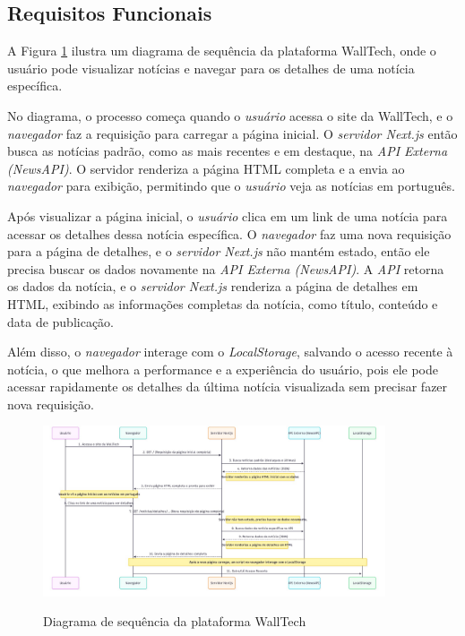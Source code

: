 \subsection{Requisitos Funcionais}
\label{subsec:requisitos-funcionais}
A Figura \ref{fig:sequence-diagram} ilustra um diagrama de sequência da plataforma WallTech, onde o usuário pode visualizar notícias e navegar para os detalhes de uma notícia específica.

No diagrama, o processo começa quando o \textit{usuário} acessa o site da WallTech, e o \textit{navegador} faz a requisição para carregar a página inicial. O \textit{servidor Next.js} então busca as notícias padrão, como as mais recentes e em destaque, na \textit{API Externa (NewsAPI)}. O servidor renderiza a página HTML completa e a envia ao \textit{navegador} para exibição, permitindo que o \textit{usuário} veja as notícias em português.

Após visualizar a página inicial, o \textit{usuário} clica em um link de uma notícia para acessar os detalhes dessa notícia específica. O \textit{navegador} faz uma nova requisição para a página de detalhes, e o \textit{servidor Next.js} não mantém estado, então ele precisa buscar os dados novamente na \textit{API Externa (NewsAPI)}. A \textit{API} retorna os dados da notícia, e o \textit{servidor Next.js} renderiza a página de detalhes em HTML, exibindo as informações completas da notícia, como título, conteúdo e data de publicação.

Além disso, o \textit{navegador} interage com o \textit{LocalStorage}, salvando o acesso recente à notícia, o que melhora a performance e a experiência do usuário, pois ele pode acessar rapidamente os detalhes da última notícia visualizada sem precisar fazer nova requisição.

\begin{figure}[H]
  \centering
  \caption{Diagrama de sequência da plataforma WallTech}
  \includegraphics[width=0.9\textwidth]{media/wall_tech_sequence_diagram.jpeg}
  \label{fig:sequence-diagram}
\end{figure}

